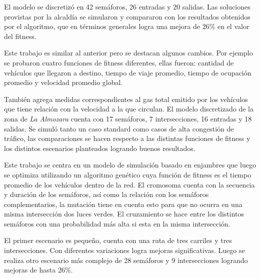 \begin{itemize}
\begin{item}
El modelo se discretizó en 42 semáforos, 26 entradas y 20 salidas.
Las soluciones provistas por la alcaldía se simularon y compararon con los resultados obtenidos por el algoritmo, que en términos generales logra una mejora de 26\% en el valor del fitness.

\end{item}

\begin{item}

Este trabajo es similar al anterior pero se destacan algunos cambios. Por ejemplo se probaron cuatro funciones de fitness diferentes, ellas fueron: cantidad de vehículos que llegaron a destino, tiempo de viaje promedio, tiempo de ocupación promedio y velocidad promedio global.

También agrega medidas correspondientes al gas total emitido por los vehículos que tiene relación con la velocidad a la que circulan.
El modelo discretizado de la zona de \emph{La Almozara} cuenta con 17 semáforos, 7 intersecciones, 16 entradas y 18 salidas.
Se simuló tanto un caso standard como casos de alta congestión de tráfico, las comparaciones se hacen respecto a las distintas funciones de fitness y los distintos escenarios planteados logrando buenos resultados.

\end{item}


\begin{item}

Este trabajo se centra en un modelo de simulación basado en enjambres que luego se optimiza utilizando un algoritmo genético cuya función de fitness es el tiempo promedio de los vehículos dentro de la red. El cromosoma cuenta con la secuencia y duración de los semáforos, así como la relación con los semáforos complementarios, la mutación tiene en cuenta esto para que no ocurra en una misma intersección dos luces verdes. El cruzamiento se hace entre los distintos semáforos con una probabilidad más alta si esta en la misma intersección.

El primer escenario es pequeño, cuenta con una ruta de tres carriles y tres intersecciones. Con diferentes variaciones logra mejoras significativas.
Luego se realiza otro escenario más complejo de 28 semáforos y 9 intersecciones logrando mejoras de hasta 26\%.
\end{item}	


\begin{item}


\end{item}
\end{itemize}
